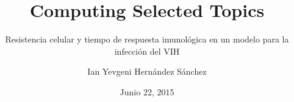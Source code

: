 \usepackage{etex}

\usepackage[T1]{fontenc}
\usepackage[utf8]{inputenc}
\usepackage[spanish]{babel}
\usepackage{amsmath,amsfonts,amsthm}
\usepackage{algcompatible}
\usepackage{algorithmicx}
\usepackage{longtable}
\usepackage{algorithm}
\usepackage{hyperref}
\usepackage{graphicx}
\usepackage{listings}
\usepackage{booktabs}
\usepackage{enumitem}
\usepackage{multirow}
\usepackage{pstricks}
\usepackage{fourier}
\usepackage{amssymb}
\usepackage{times}

\usepackage[font=footnotesize,labelfont=bf]{caption}

\usepackage[scale=2]{ccicons}
\usepackage{minted}

\usepackage{ragged2e}
\justifying

 {
}


\title[CST]{Computing Selected Topics}

\subtitle[Computing Selected Topics]{Resistencia celular y tiempo de respuesta imunológica en un modelo para la infección del VIH}


\author{Ian Yevgeni Hernández Sánchez}

\date{Junio 22, 2015}

\hypersetup{
	colorlinks=true,
	linkcolor=black,
	filecolor=black,
	urlcolor=black,
	citecolor=black
}








\renewcommand{\algorithmicrequire}{\textbf{Entrada:}}
\renewcommand{\algorithmicensure}{\textbf{Salida:}}



